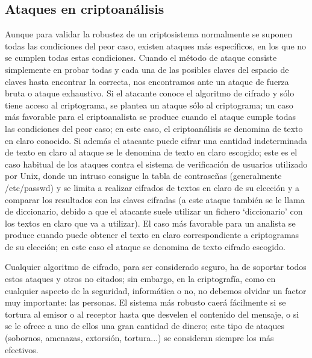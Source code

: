 \subsection{Ataques en criptoanálisis}
Aunque para validar la robustez de un criptosistema normalmente se suponen todas las condiciones del peor caso, existen ataques más específicos, en los que no se cumplen todas estas condiciones. Cuando el método de ataque consiste simplemente en probar todas y cada una de las posibles claves del espacio de claves hasta encontrar la correcta, nos encontramos ante un ataque de fuerza bruta o ataque exhaustivo. Si el atacante conoce el algoritmo de cifrado y sólo tiene acceso al criptograma, se plantea un ataque sólo al criptograma; un caso más favorable para el criptoanalista se produce cuando el ataque cumple todas las condiciones del peor caso; en este caso, el criptoanálisis se denomina de texto en claro conocido. Si además el atacante puede cifrar una cantidad indeterminada de texto en claro al ataque se le denomina de texto en claro escogido; este es el caso habitual de los ataques contra el sistema de verificación de usuarios utilizado por Unix, donde un intruso consigue la tabla de contraseñas (generalmente /etc/passwd) y se limita a realizar cifrados de textos en claro de su elección y a comparar los resultados con las claves cifradas (a este ataque también se le llama de diccionario, debido a que el atacante suele utilizar un fichero `diccionario' con los textos en claro que va a utilizar). El caso más favorable para un analista se produce cuando puede obtener el texto en claro correspondiente a criptogramas de su elección; en este caso el ataque se denomina de texto cifrado escogido. 

Cualquier algoritmo de cifrado, para ser considerado seguro, ha de soportar todos estos ataques y otros no citados; sin embargo, en la criptografía, como en cualquier aspecto de la seguridad, informática o no, no debemos olvidar un factor muy importante: las personas. El sistema más robusto caerá fácilmente si se tortura al emisor o al receptor hasta que desvelen el contenido del mensaje, o si se le ofrece a uno de ellos una gran cantidad de dinero; este tipo de ataques (sobornos, amenazas, extorsión, tortura...) se consideran siempre los más efectivos. 

